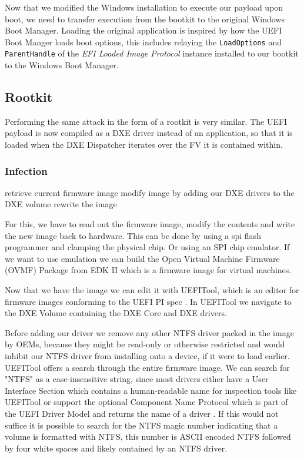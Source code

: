Now that we modified the Windows installation to execute our payload upon boot, we need to transfer execution from the bootkit to the original Windows Boot Manager. Loading the original application is inspired by how the UEFI Boot Manger loads boot options, this includes relaying the \lstinline{LoadOptions} and \lstinline{ParentHandle} of the \emph{\ac{EFI} Loaded Image Protocol} \cite[9.1]{uefi-spec} instance installed to our bootkit to the Windows Boot Manager.


\subsection{Rootkit}

Performing the same attack in the form of a rootkit is very similar. The \ac{UEFI} payload is now compiled as a \ac{DXE} driver instead of an application, so that it is loaded when the \ac{DXE} Dispatcher iterates over the \ac{FV} it is contained within.

\subsubsection{Infection}


retrieve current firmware image
modify image by adding our DXE drivers to the DXE volume
rewrite the image

For this, we have to read out the firmware image, modify the contents and write the new image back to hardware. This can be done by using a spi flash programmer and clamping the physical chip. Or using an SPI chip emulator. 
If we want to use emulation we can build the Open Virtual Machine Firmware (OVMF) Package from EDK II which is a firmware image for virtual machines.

Now that we have the image we can edit it with UEFITool, which is an editor for firmware images conforming to the UEFI PI spec \cite{uefitool}.
In UEFITool we navigate to the DXE Volume containing the DXE Core and DXE drivers.

Before adding our driver we remove any other NTFS driver packed in the image by OEMs, because they might be read-only or otherwise restricted and would inhibit our NTFS driver from installing onto a device, if it were to load earlier. UEFITool offers a search through the entire firmware image. We can search for "NTFS" as a case-insensitive string, since most drivers either have a User Interface Section which contains a human-readable name for inspection tools like UEFITool \cite[Vol 3, 3.2.5]{pi-spec} or support the optional Component Name Protocol which is part of the UEFI Driver Model and returns the name of a driver \cite[11.5]{uefi-spec}. If this would not suffice it is possible to search for the NTFS magic number indicating that a volume is formatted with NTFS, this number is ASCII encoded NTFS followed by four white spaces and likely contained by an NTFS driver.

